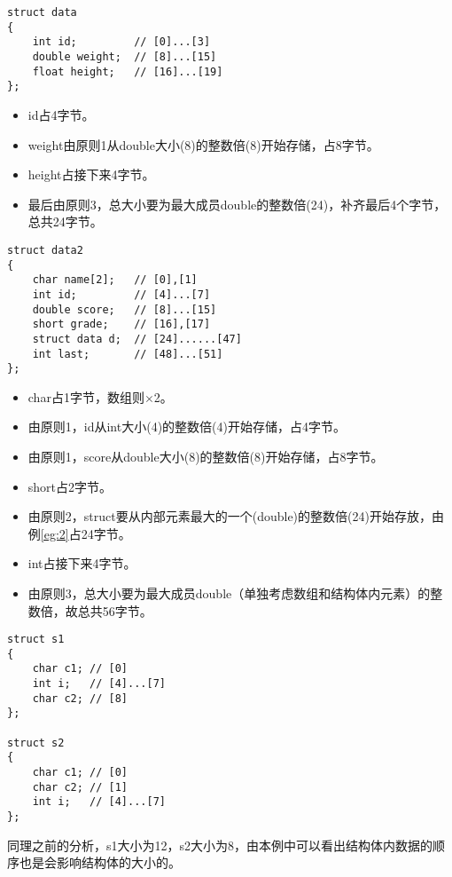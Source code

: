 \documentclass[11pt,UTF8]{ctexart}
\begin{document}
\begin{example}
\label{eg:2}
\begin{lstlisting}
struct data
{
    int id;         // [0]...[3]
    double weight;  // [8]...[15]
    float height;   // [16]...[19]
};
\end{lstlisting}
\end{example}
\begin{analysis}
\begin{itemize}
	\itemsep -3pt
	\item id占4字节。
	\item weight由原则1从double大小(8)的整数倍(8)开始存储，占8字节。
	\item height占接下来4字节。
	\item 最后由原则3，总大小要为最大成员double的整数倍(24)，补齐最后4个字节，总共24字节。
\end{itemize}
\end{analysis}

\begin{example}
\begin{lstlisting}
struct data2
{
    char name[2];   // [0],[1]
    int id;         // [4]...[7]
    double score;   // [8]...[15]
    short grade;    // [16],[17]
    struct data d;  // [24]......[47]
    int last;       // [48]...[51]
};
\end{lstlisting}
\end{example}
\begin{analysis}
\begin{itemize}
	\itemsep -3pt
	\item char占1字节，数组则$\times$2。
	\item 由原则1，id从int大小(4)的整数倍(4)开始存储，占4字节。
	\item 由原则1，score从double大小(8)的整数倍(8)开始存储，占8字节。
	\item short占2字节。
	\item 由原则2，struct要从内部元素最大的一个(double)的整数倍(24)开始存放，由例\ref{eg:2}占24字节。
	\item int占接下来4字节。
	\item 由原则3，总大小要为最大成员double（单独考虑数组和结构体内元素）的整数倍，故总共56字节。
\end{itemize}
\end{analysis}

\begin{example}
\begin{lstlisting}
struct s1
{   
    char c1; // [0]
    int i;   // [4]...[7]
    char c2; // [8]
};

struct s2
{  
    char c1; // [0]
    char c2; // [1]
    int i;   // [4]...[7]
};
\end{lstlisting}
\end{example}
\begin{analysis}
同理之前的分析，s1大小为12，s2大小为8，由本例中可以看出结构体内数据的顺序也是会影响结构体的大小的。
\end{analysis}
\end{document}
